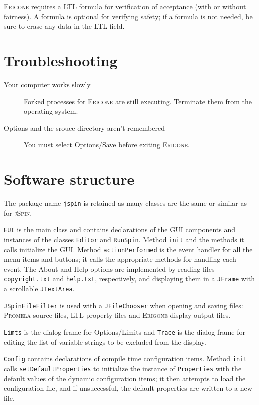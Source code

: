 \documentclass[11pt]{article}
\newcommand{\eri}{\textsc{Erigone}}
\newcommand{\prm}{\textsc{Promela}}
\newcommand{\js}{\textsc{jSpin}}
\newcommand{\p}[1]{\texttt{#1}}
\newcommand{\bu}[1]{\textsf{#1}}
\begin{document}
\eri{} requires a LTL formula for verification of acceptance (with or
without fairness). A formula is optional for verifying safety; if a
formula is not needed, be sure to erase any data in the LTL field.


\section{Troubleshooting}
\begin{description}
\item[Your computer works slowly] Forked processes for \eri{} are still executing.
Terminate them from the operating system.
\item[Options and the srouce directory aren't remembered]
You must select \bu{Options/Save} before exiting \eri{}.
\end{description}

\newpage

\section{Software structure}

The package name \p{jspin} is retained as many classes are the same or
similar as for \js{}.

\p{EUI} is the main class and contains declarations
of the GUI components and instances
of the classes \p{Editor} and \p{RunSpin}.
Method \p{init} and the methods it calls initialize the GUI.
Method \p{action\-Per\-formed} is the event handler for all the menu items
and buttons; it calls the appropriate methods for handling each event.
The \bu{About} and \bu{Help} options are implemented by reading files
\p{copyright.txt} and \p{help.txt}, respectively, and displaying
them in a \p{JFrame} with a scrollable \p{JTextArea}.

\p{JSpinFileFilter} is used with a \p{JFileChooser}
when opening and saving files: \prm{} source files,
LTL property files and \eri{} display output files.

\p{Limts} is the dialog frame for \bu{Options/Limits} and \p{Trace} is
the dialog frame for editing the list of variable strings to be excluded
from the display.

\p{Config} contains declarations of compile time configuration items.
Method \p{init} calls \p{set\-Default\-Properties} to initialize the instance
of \p{Properties} with the default values of the dynamic configuration
items; it then attempts to load the configuration file, and if unsuccessful,
the default properties are written to a new file.
\end{document}
